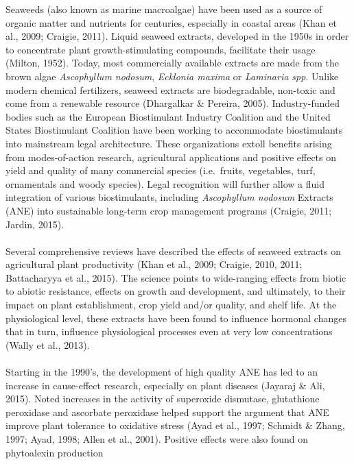 \documentclass[11pt,]{article}
\begin{document}
Seaweeds (also known as marine macroalgae) have been used as a source of
organic matter and nutrients for centuries, especially in coastal areas
(Khan et al., 2009; Craigie, 2011). Liquid seaweed extracts, developed
in the 1950s in order to concentrate plant growth-stimulating compounds,
facilitate their usage (Milton, 1952). Today, most commercially
available extracts are made from the brown algae \emph{Ascophyllum
nodosum}, \emph{Ecklonia maxima} or \emph{Laminaria spp}. Unlike modern
chemical fertilizers, seaweed extracts are biodegradable, non-toxic and
come from a renewable resource (Dhargalkar \& Pereira, 2005).
Industry-funded bodies such as the European Biostimulant Industry
Coalition and the United States Biostimulant Coalition have been working
to accommodate biostimulants into mainstream legal architecture. These
organizations extoll benefits arising from modes-of-action research,
agricultural applications and positive effects on yield and quality of
many commercial species (i.e.~fruits, vegetables, turf, ornamentals and
woody species). Legal recognition will further allow a fluid integration
of various biostimulants, including \emph{Ascophyllum nodosum} Extracts
(ANE) into sustainable long-term crop management programs (Craigie,
2011; Jardin, 2015).\\
\hspace*{0.333em}\\
Several comprehensive reviews have described the effects of seaweed
extracts on agricultural plant productivity (Khan et al., 2009; Craigie,
2010, 2011; Battacharyya et al., 2015). The science points to
wide-ranging effects from biotic to abiotic resistance, effects on
growth and development, and ultimately, to their impact on plant
establishment, crop yield and/or quality, and shelf life. At the
physiological level, these extracts have been found to influence
hormonal changes that in turn, influence physiological processes even at
very low concentrations (Wally et al., 2013).\\
\hspace*{0.333em}\\
Starting in the 1990's, the development of high quality ANE has led to
an increase in cause-effect research, especially on plant diseases
(Jayaraj \& Ali, 2015). Noted increases in the activity of superoxide
dismutase, glutathione peroxidase and ascorbate peroxidase helped
support the argument that ANE improve plant tolerance to oxidative
stress (Ayad et al., 1997; Schmidt \& Zhang, 1997; Ayad, 1998; Allen et
al., 2001). Positive effects were also found on phytoalexin production
\end{document}
